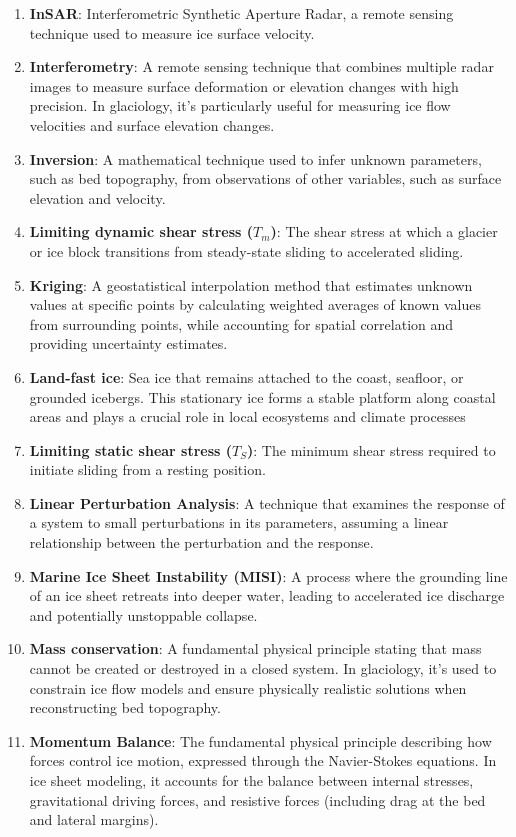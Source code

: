 \begin{enumerate}
\item \textbf{InSAR}: Interferometric Synthetic Aperture Radar, a remote sensing technique used to measure ice surface velocity.
\item \textbf{Interferometry}: A remote sensing technique that combines multiple radar images to measure surface deformation or elevation changes with high precision. In glaciology, it's particularly useful for measuring ice flow velocities and surface elevation changes.
\item \textbf{Inversion}: A mathematical technique used to infer unknown parameters, such as bed topography, from observations of other variables, such as surface elevation and velocity.
\item \textbf{Limiting dynamic shear stress ($T_m$)}: The shear stress at which a glacier or ice block transitions from steady-state sliding to accelerated sliding.
\item \textbf{Kriging}: A geostatistical interpolation method that estimates unknown values at specific points by calculating weighted averages of known values from surrounding points, while accounting for spatial correlation and providing uncertainty estimates.
\item \textbf{Land-fast ice}: Sea ice that remains attached to the coast, seafloor, or grounded icebergs. This stationary ice forms a stable platform along coastal areas and plays a crucial role in local ecosystems and climate processes
\item \textbf{Limiting static shear stress ($T_S$)}: The minimum shear stress required to initiate sliding from a resting position.
\item \textbf{Linear Perturbation Analysis}: A technique that examines the response of a system to small perturbations in its parameters, assuming a linear relationship between the perturbation and the response.
\item \textbf{Marine Ice Sheet Instability (MISI)}: A process where the grounding line of an ice sheet retreats into deeper water, leading to accelerated ice discharge and potentially unstoppable collapse.
\item \textbf{Mass conservation}: A fundamental physical principle stating that mass cannot be created or destroyed in a closed system. In glaciology, it's used to constrain ice flow models and ensure physically realistic solutions when reconstructing bed topography.
\item \textbf{Momentum Balance}: The fundamental physical principle describing how forces control ice motion, expressed through the Navier-Stokes equations. In ice sheet modeling, it accounts for the balance between internal stresses, gravitational driving forces, and resistive forces (including drag at the bed and lateral margins).

\end{enumerate}
